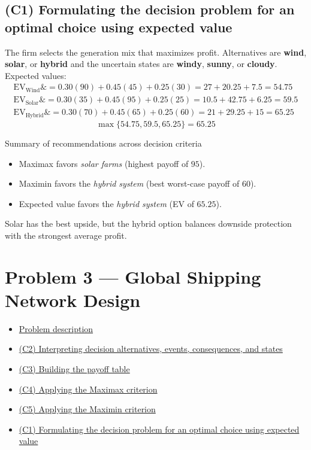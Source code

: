 \documentclass[11pt]{article}
\begin{document}
	\subsection*{(C1) Formulating the decision problem for an optimal choice using expected value}
	
	\hypertarget{problem2-c1}{}
	
	The firm selects the generation mix that maximizes profit. Alternatives are \textbf{wind},
	\textbf{solar}, or \textbf{hybrid} and the uncertain states are \textbf{windy},
	\textbf{sunny}, or \textbf{cloudy}. Expected values:
	\[
	\begin{aligned}
		\mathrm{EV}_{\text{Wind}} \&= 0.30(90) + 0.45(45) + 0.25(30) = 27 + 20.25 + 7.5 = 54.75 \\
		\mathrm{EV}_{\text{Solar}} \&= 0.30(35) + 0.45(95) + 0.25(25) = 10.5 + 42.75 + 6.25 = 59.5 \\
		\mathrm{EV}_{\text{Hybrid}} \&= 0.30(70) + 0.45(65) + 0.25(60) = 21 + 29.25 + 15 = 65.25
	\end{aligned}
	\]
	\[
	\max\{54.75, 59.5, 65.25\} = 65.25
	\]
	
	Summary of recommendations across decision criteria
	\begin{itemize}
		\item Maximax favors \emph{solar farms} (highest payoff of $95$).
		\item Maximin favors the \emph{hybrid system} (best worst-case payoff of $60$).
		\item Expected value favors the \emph{hybrid system} (EV of $65.25$).
	\end{itemize}
	
	Solar has the best upside, but the hybrid option balances downside protection with the strongest average profit.
	
	\section*{Problem 3 — Global Shipping Network Design}
	
	\hypertarget{problem3}{}
	
	\hypertarget{problem3-criteria}{}
	
	
	\begin{itemize}
		\item \hyperlink{problem3-problem}{Problem description}
		\item \hyperlink{problem3-c2}{(C2) Interpreting decision alternatives, events, consequences, and states}
		\item \hyperlink{problem3-c3}{(C3) Building the payoff table}
		\item \hyperlink{problem3-c4}{(C4) Applying the Maximax criterion}
		\item \hyperlink{problem3-c5}{(C5) Applying the Maximin criterion}
		\item \hyperlink{problem3-c1}{(C1) Formulating the decision problem for an optimal choice using expected value}
	\end{itemize}
	
\end{document}

